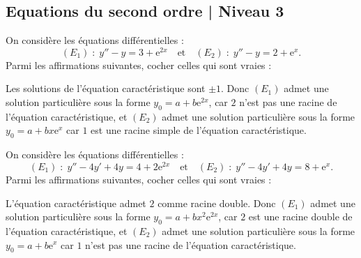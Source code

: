 \subsection{Equations du second ordre | Niveau 3}

\begin{question}
On considère les équations différentielles :
$$(E_1)\; :\; y''-y=3+\mathrm{e}^{2x}\quad \mbox{et}\quad (E_2)\; :\; y''-y=2+\mathrm{e}^{x}.$$
Parmi les affirmations suivantes, cocher celles qui sont vraies :
\begin{answers}  
\end{answers}
\begin{explanations}
Les solutions de l'équation caractéristique sont $\pm 1$. Donc $(E_1)$ admet une solution particulière sous la forme $\displaystyle y_0=a+b\mathrm{e}^{2x}$, car $2$ n'est pas une racine de l'équation caractéristique, et $(E_2)$ admet une solution particulière sous la forme $\displaystyle y_0=a+bx\mathrm{e}^{x}$ car $1$ est une racine simple de l'équation caractéristique.
\end{explanations}
\end{question}

\begin{question}
On considère les équations différentielles :
$$(E_1)\; :\; y''-4y'+4y=4+2\mathrm{e}^{2x}\quad \mbox{et}\quad (E_2)\; :\; y''-4y'+4y=8+\mathrm{e}^{x}.$$
Parmi les affirmations suivantes, cocher celles qui sont vraies :
\begin{answers}  
\end{answers}
\begin{explanations}
L'équation caractéristique admet $2$ comme racine double. Donc $(E_1)$ admet une solution particulière sous la forme $\displaystyle y_0=a+bx^2\mathrm{e}^{2x}$, car $2$ est une racine double de l'équation caractéristique, et $(E_2)$ admet une solution particulière sous la forme $\displaystyle y_0=a+b\mathrm{e}^{x}$ car $1$ n'est pas une racine de l'équation caractéristique.
\end{explanations}
\end{question}

